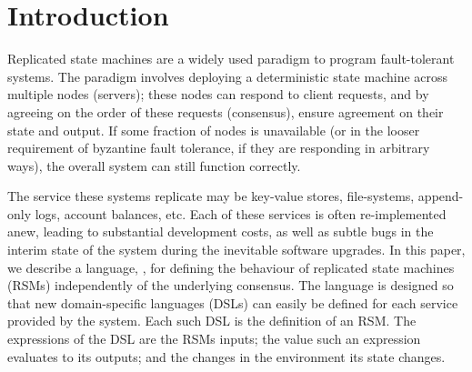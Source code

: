\section{Introduction}
\label{s:introduction}







Replicated state machines are a widely used paradigm to program fault-tolerant
systems. The paradigm involves deploying a deterministic state machine across
multiple nodes (servers); these nodes can respond to client requests, and by
agreeing on the order of these requests (consensus), ensure agreement on their
state and output. If some fraction of nodes is unavailable (or in the looser
requirement of byzantine fault tolerance, if they are responding in arbitrary
ways), the overall system can
still function correctly.

The service these systems replicate may be key-value stores, file-systems,
append-only logs, account balances, etc. Each of these
services is often re-implemented anew, leading to substantial development
costs, as well as subtle bugs in the interim state of the system during the
inevitable software upgrades. In this paper, we describe a language, \rad{}, for
defining the behaviour of replicated state machines (RSMs) independently of the
underlying consensus. The language is designed so that new domain-specific
languages (DSLs) can easily be defined for each service provided by the system.
Each such DSL is the definition of an RSM. The expressions of the DSL
are the RSMs inputs; the value such an expression evaluates to its outputs; and
the changes in the environment its state changes.

